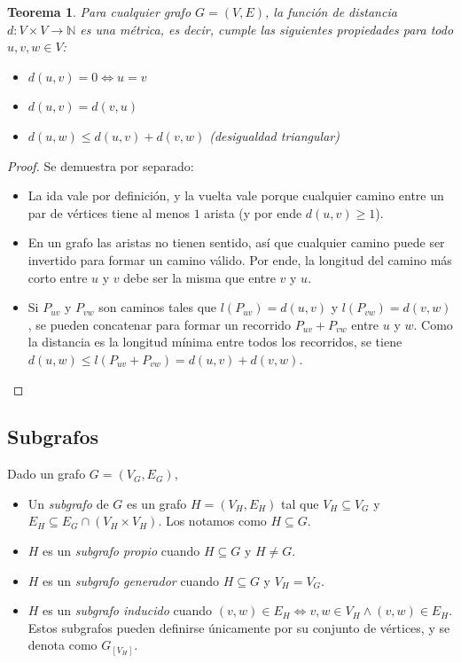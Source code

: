 \documentclass[a4paper]{report}
\newcommand{\N}{\mathbb{N}}
\newtheorem*{theorem*}{Teorema}
\begin{document}
\begin{theorem*}
    Para cualquier grafo $G = (V, E)$, la función de distancia $d: V \times V \longrightarrow \N$ es una métrica, es decir, cumple las siguientes propiedades para todo $u, v, w \in V$:
    \begin{itemize}
        \item $d(u, v) = 0 \iff u = v$
        \item $d(u, v) = d(v, u)$
        \item $d(u, w) \leq d(u, v) + d(v, w)$ (desigualdad triangular)
    \end{itemize}
\end{theorem*}
\begin{proof}
    Se demuestra por separado:
    \begin{itemize}
        \item La ida vale por definición, y la vuelta vale porque cualquier camino entre un par de vértices tiene al menos $1$ arista (y por ende $d(u, v) \geq 1$).
        \item En un grafo las aristas no tienen sentido, así que cualquier camino puede ser invertido para formar un camino válido. Por ende, la longitud del camino más corto entre $u$ y $v$ debe ser la misma que entre $v$ y $u$.
        \item Si $P_{uv}$ y $P_{vw}$ son caminos tales que $l(P_{uv}) = d(u,v)$ y $l(P_{vw}) = d(v,w)$, se pueden concatenar para formar un recorrido $P_{uv} + P_{vw}$ entre $u$ y $w$. Como la distancia es la longitud mínima entre todos los recorridos, se tiene $d(u, w) \leq l(P_{uv} + P_{vw}) = d(u, v) + d(v, w)$.
    \end{itemize}

\end{proof}

\subsection{Subgrafos}
\label{subgrafos}

Dado un grafo $G = (V_G, E_G)$,

\begin{itemize}
    \item Un \textit{subgrafo} de $G$ es un grafo $H = (V_H, E_H)$ tal que $V_H \subseteq V_G$ y $E_H \subseteq E_G \cap (V_H \times V_H)$. Los notamos como $H \subseteq G$.
    \item $H$ es un \textit{subgrafo propio} cuando $H \subseteq G$ y $H \neq G$.
    \item $H$ es un \textit{subgrafo generador} cuando $H \subseteq G$ y $V_H = V_G$.
    \item $H$ es un \textit{subgrafo inducido} cuando $(v, w) \in E_H \iff v,w \in V_H \land (v, w) \in E_H$. Estos subgrafos pueden definirse únicamente por su conjunto de vértices, y se denota como $G_{[V_H]}$.
\end{itemize}
\end{document}
